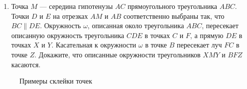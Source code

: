 \documentclass{article}
\begin{document}
\begin{enumerate}[label*=\protect\fbox{\arabic{enumi}}]
		\item Точка $M$ — середина гипотенузы $AC$ прямоугольного треугольника $ABC$. Точки $D$ и $E$ на отрезках $AM$ и $AB$ соответственно выбраны так, что $BC \parallel DE$. Окружность $\omega$, описанная около треугольника $ABC$, пересекает описанную окружность треугольника $CDE$ в точках $C$ и $F$, а прямую $DE$ в точках $X$ и $Y$. Касательная к окружности $\omega$ в точке $B$ пересекает луч $FC$ в точке $Z$. Докажите, что описанные окружности треугольников $XMY$ и $BFZ$ касаются.
		
	\end{enumerate} 
	
	\begin{figure}[h]
		\caption{Примеры склейки точек}
	\end{figure}
\end{document}
